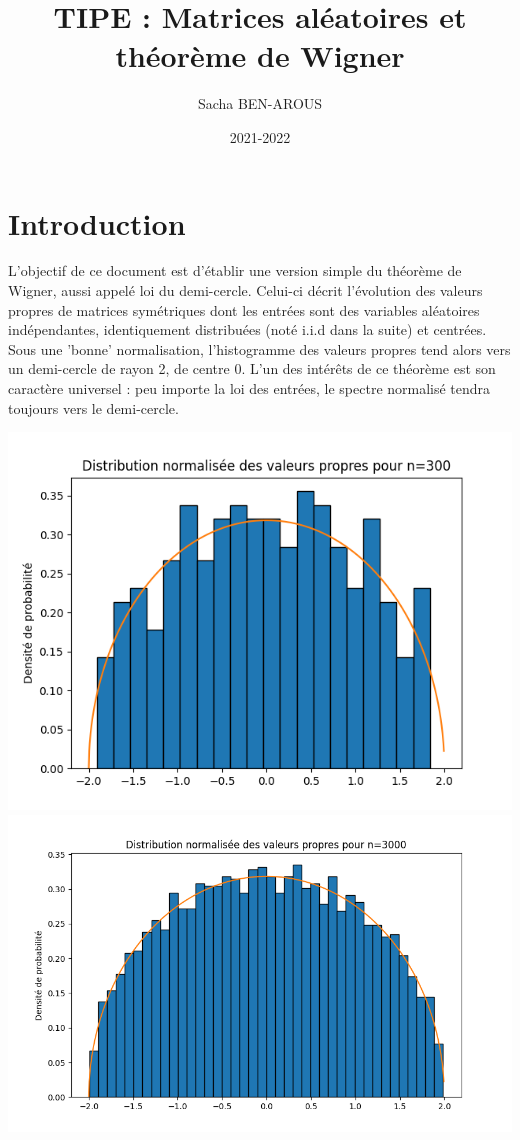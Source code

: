 \documentclass[10pt,a4paper]{article}
\begin{document}
\title{TIPE : Matrices aléatoires et théorème de Wigner}
\date{2021-2022}
\author{Sacha BEN-AROUS}
\maketitle 
\section{Introduction}

L'objectif de ce document est d'établir une version simple du théorème de Wigner, aussi appelé loi du demi-cercle. Celui-ci décrit l'évolution des valeurs propres de matrices symétriques dont les entrées sont des variables aléatoires indépendantes, identiquement distribuées (noté i.i.d dans la suite) et centrées. Sous une 'bonne' normalisation, l'histogramme des valeurs propres tend alors vers un demi-cercle de rayon 2, de centre 0. L'un des intérêts de ce théorème est son caractère universel : peu importe la loi des entrées, le spectre normalisé tendra toujours vers le demi-cercle.

\includegraphics[scale=0.452]{Figure_300.png} \includegraphics[scale=0.4]{Figure_1.png}
\end{document}
